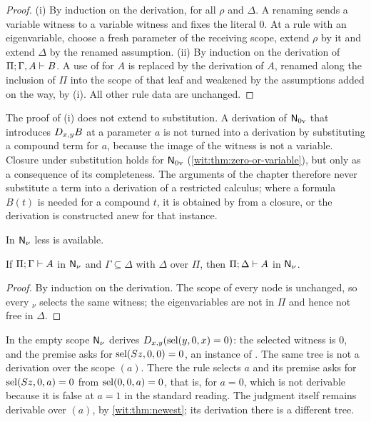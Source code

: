 \begin{proof}
(i) By induction on the derivation, for all $\rho$ and $\Delta$.  A renaming
sends a variable witness to a variable witness and fixes the literal $0$.
At a rule with an eigenvariable, choose a fresh parameter of the receiving
scope, extend $\rho$ by it and extend $\Delta$ by the renamed assumption.
(ii) By induction on the derivation of $\Pi;\Gamma,A\vdash B$.  A use of
 for $A$ is replaced by the derivation of $A$, renamed along
the inclusion of $\Pi$ into the scope of that leaf and weakened by the
assumptions added on the way, by (i).  All other rule data are unchanged.
\end{proof}

The proof of (i) does not extend to substitution.  A derivation of
$\mathsf{N}_{0\mathrm v}$ that introduces $D_{x,y}B$ at a parameter $a$ is not
turned into a derivation by substituting a compound term for $a$, because
the image of the witness is not a variable.  Closure under substitution
holds for $\mathsf{N}_{0\mathrm v}$ (\cref{wit:thm:zero-or-variable}), but only as
a consequence of its completeness.  The arguments of the chapter therefore
never substitute a term into a derivation of a restricted calculus; where a
formula $B(t)$ is needed for a compound $t$, it is obtained by 
from a closure, or the derivation is constructed anew for that instance.

In $\mathsf{N}_{\nu}$ less is available.

\begin{lemma}
\label{wit:lem:ctxweak}
If $\Pi;\Gamma\vdash A$ in $\mathsf{N}_{\nu}$ and $\Gamma\subseteq\Delta$ with
$\Delta$ over $\Pi$, then $\Pi;\Delta\vdash A$ in $\mathsf{N}_{\nu}$.
\end{lemma}

\begin{proof}
By induction on the derivation.  The scope of every node is unchanged, so
every $_\nu$ selects the same witness; the eigenvariables are
not in $\Pi$ and hence not free in $\Delta$.
\end{proof}

\begin{example}
\label{wit:ex:weakening}
In the empty scope $\mathsf{N}_{\nu}$ derives $D_{x,y}(\operatorname{sel}(y,0,x)=0)$:
the selected witness is $0$, and the premise asks for
$\operatorname{sel}(S z,0,0)=0$, an instance of .  The same tree is not a
derivation over the scope $(a)$.  There the rule selects $a$ and its premise
asks for $\operatorname{sel}(S z,0,a)=0$ from $\operatorname{sel}(0,0,a)=0$, that is, for $a=0$,
which is not derivable because it is false at $a=1$ in the standard reading.
The judgment itself remains derivable over $(a)$, by
\cref{wit:thm:newest}; its derivation there is a different tree.
\end{example}

